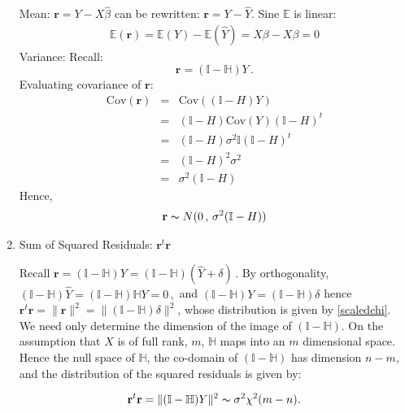 \begin{enumerate}
 Mean:
 \newline \newline
 $\mathbf{r}= Y - X \hat{\beta}$ can be rewritten: $\mathbf{r} = Y - \hat{Y}$. Sine $\mathbb{E}$ is linear:
 \begin{eqnarray}
 \mathbb{E}(\mathbf{r}) = \mathbb{E}(Y) - \mathbb{E}(\hat{Y}) = X \beta - X \beta = 0
\end{eqnarray}  
Variance:
\newline
\newline
Recall:
\[ \mathbf{r} = (\mathbb{I} - \mathbb{H}) Y \,.\]
Evaluating covariance of $\mathbf{r}$:
\begin{eqnarray}
\mbox{Cov}(\mathbf{r}) &=& \mbox{Cov}( (\mathbb{I} - H) Y ) \nonumber \\ &=& (\mathbb{I} - H ) \mbox{Cov}(Y) (\mathbb{I} - H )^t \nonumber \\ &=&  (\mathbb{I} - H ) \sigma^2 \mathbb{I} (\mathbb{I} - H )^t \nonumber \\ &=&  (\mathbb{I} - H )^2 \sigma^2 \nonumber \\ &=&  \sigma^2 (\mathbb{I} - H )
\end{eqnarray}
Hence, \begin{eqnarray} \mathbf{r} \thicksim N(0\,, \,\sigma^2 (\mathbb{I} - H ) ) \label{residualdistribution} \end{eqnarray}

\item Sum of Squared Residuals: $ \mathbf{r}^t\mathbf{r} $
\newline \newline 

Recall $\mathbf{r} = (\mathbb{I}- \mathbb{H}) Y  = (\mathbb{I}- \mathbb{H}) (\hat{Y} + \delta )\,.$ By orthogonality, $(\mathbb{I}- \mathbb{H}) \hat{Y} = (\mathbb{I}- \mathbb{H}) \mathbb{H} Y = 0 \,,$ and $(\mathbb{I}- \mathbb{H}) Y  = (\mathbb{I}- \mathbb{H}) \delta$  hence $ \mathbf{r}^t\mathbf{r} = \|\mathbf{r}\|^2 = \| (\mathbb{I}- \mathbb{H})\delta \|^2 $, whose distribution is given by \ref{scaledchi}. We need only determine the dimension of the image of $(\mathbb{I}- \mathbb{H})$. On the assumption that $X$ is of full rank, $m$, $\mathbb{H}$ maps into an $m$ dimensional space. Hence the null space of $\mathbb{H}$, the co-domain of $(\mathbb{I}- \mathbb{H})$ has dimension $n-m$, and the distribution of the squared residuals is given by: 

\begin{eqnarray}  \mathbf{r}^t\mathbf{r} =  \| (\mathbb{I}- \mathbb{H})Y\|^2 \thicksim \sigma^2 \chi^2(m - n). \end{eqnarray}


\end{enumerate}
